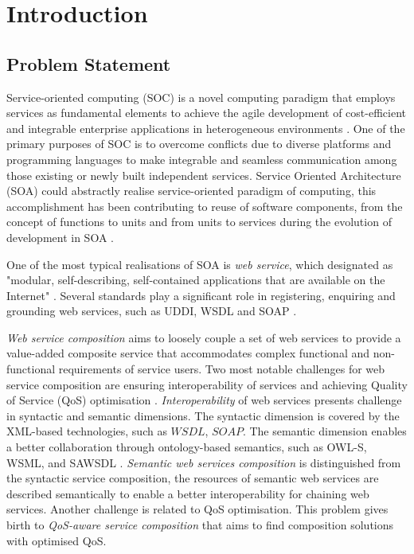 \chapter{Introduction}\label{C:intro}

\section{Problem Statement}
Service-oriented computing (SOC) is a novel computing paradigm that employs services as fundamental elements to achieve the agile development of cost-efficient and integrable enterprise applications in heterogeneous environments \cite{papazoglou2003service, papazoglou2006p}. One of the primary purposes of SOC is to overcome conflicts due to diverse platforms and programming languages to make integrable and seamless communication among those existing or newly built independent services. Service Oriented Architecture (SOA)  could abstractly realise service-oriented paradigm of computing, this accomplishment has been contributing to reuse of software components, from the concept of functions to units and from units to services during the evolution of development in SOA \cite{booth2004web, overdick2007resource}. 

One of the most typical realisations of SOA is \textit{web service}, which designated as "modular, self-describing, self-contained applications that are available on the Internet" \cite{curbera2001web}. Several standards play a significant role in registering, enquiring and grounding web services, such as UDDI, WSDL and SOAP \cite{fensel2011semantic}. 

\textit{Web service composition} aims to loosely couple a set of web services to provide a value-added composite service that accommodates complex functional and non-functional requirements of service users. 
Two most notable challenges for web service composition are ensuring interoperability of services and achieving Quality of Service (QoS) optimisation \cite{fensel2011semantic}. \textit{Interoperability} of web services presents challenge in syntactic and semantic dimensions. The syntactic dimension is covered by the XML-based technologies, such as $WSDL$, $SOAP$. The semantic dimension enables a better collaboration through ontology-based semantics, such as OWL-S, WSML, and SAWSDL \cite{petrie2016web}. \textit{Semantic web services composition} is distinguished from the syntactic service composition, the resources of semantic web services are described semantically to enable a better interoperability for chaining web services. Another challenge is related to QoS optimisation. This problem gives birth to \textit{QoS-aware service composition} that aims to find composition solutions with optimised QoS.

